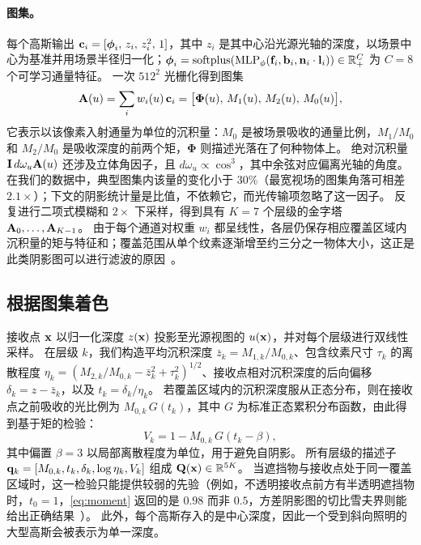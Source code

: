 \paragraph{图集。}
每个高斯输出 $\mathbf{c}_i=[\boldsymbol\phi_i,\,z_i,\,z_i^2,\,1]$，其中 $z_i$ 是其中心沿光源光轴的深度，以场景中心为基准并用场景半径归一化；$\boldsymbol\phi_i=\operatorname{softplus}(\mathrm{MLP}_\phi(\mathbf{f}_i,\mathbf{b}_i,\mathbf{n}_i\cdot\mathbf{l}_i))\in\mathbb R_+^{C}$ 为 $C=8$ 个可学习通量特征。
一次 $512^2$ 光栅化得到图集
\begin{equation}
  \mathbf{A}(u)=\sum_i w_i(u)\,\mathbf{c}_i=\big[\boldsymbol\Phi(u),\,M_1(u),\,M_2(u),\,M_0(u)\big],
  \label{eq:atlas}
\end{equation}
它表示以该像素入射通量为单位的沉积量：$M_0$ 是被场景吸收的通量比例，$M_1/M_0$ 和 $M_2/M_0$ 是吸收深度的前两个矩，$\boldsymbol\Phi$ 则描述光落在了何种物体上。
绝对沉积量 $\mathbf{I}\,d\omega_u\mathbf{A}(u)$ 还涉及立体角因子，且 $d\omega_u\propto\cos^3$，其中余弦对应偏离光轴的角度。
在我们的数据中，典型图集内该量的变化小于 30\%（最宽视场的图集角落可相差 $2.1\times$）；下文的阴影统计量是比值，不依赖它，而光传输项忽略了这一因子。
反复进行二项式模糊和 $2\times$ 下采样，得到具有 $K=7$ 个层级的金字塔 $\mathbf{A}_0,\dots,\mathbf{A}_{K-1}$。
由于每个通道对权重 $w_i$ 都呈线性，各层仍保存相应覆盖区域内沉积量的矩与特征和；覆盖范围从单个纹素逐渐增至约三分之一物体大小，这正是此类阴影图可以进行滤波的原因~\cite{donnelly2006variance,peters2015moment}。

\subsection{根据图集着色}
\label{sec:shading}
接收点 $\mathbf{x}$ 以归一化深度 $z(\mathbf{x})$ 投影至光源视图的 $u(\mathbf{x})$，并对每个层级进行双线性采样。
在层级 $k$，我们构造平均沉积深度 $\bar z_k=M_{1,k}/M_{0,k}$、包含纹素尺寸 $\tau_k$ 的离散程度 $\eta_k=(M_{2,k}/M_{0,k}-\bar z_k^2+\tau_k^2)^{1/2}$、接收点相对沉积深度的后向偏移 $\delta_k=z-\bar z_k$，以及 $t_k=\delta_k/\eta_k$。
若覆盖区域内的沉积深度服从正态分布，则在接收点之前吸收的光比例为 $M_{0,k}\,G(t_k)$，其中 $G$ 为标准正态累积分布函数，由此得到基于矩的检验：
\begin{equation}
  V_k=1-M_{0,k}\,G(t_k-\beta),
  \label{eq:moment}
\end{equation}
其中偏置 $\beta=3$ 以局部离散程度为单位，用于避免自阴影。
所有层级的描述子 $\mathbf{q}_k=[M_{0,k},t_k,\delta_k,\log\eta_k,V_k]$ 组成 $\mathbf{Q}(\mathbf{x})\in\mathbb R^{5K}$。
当遮挡物与接收点处于同一覆盖区域时，这一检验只能提供较弱的先验（例如，不透明接收点前方有半透明遮挡物时，$t_0=1$，\cref{eq:moment} 返回的是 $0.98$ 而非 $0.5$，方差阴影图的切比雪夫界则能给出正确结果~\cite{donnelly2006variance}）。
此外，每个高斯存入的是中心深度，因此一个受到斜向照明的大型高斯会被表示为单一深度。

